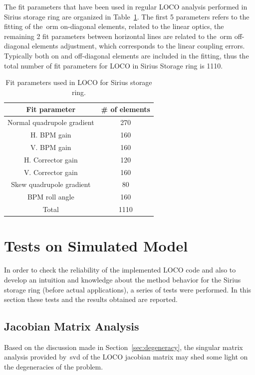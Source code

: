 The fit parameters that have been used in regular LOCO analysis performed in Sirius storage ring are organized in Table~\ref{tab:fit_params}. The first 5 parameters refers to the fitting of the~\gls{orm} on-diagonal elements, related to the linear optics, the remaining 2 fit parameters between horizontal lines are related to the~\gls{orm} off-diagonal elements adjustment, which corresponds to the linear coupling errors. Typically both on and off-diagonal elements are included in the fitting, thus the total number of fit parameters for LOCO in Sirius Storage ring is 1110.
\begin{table}
    \centering
    \caption{Fit parameters used in LOCO for Sirius storage ring.}
    \label{tab:fit_params}
    \begin{tabular}{cc}
        \toprule\toprule
        Fit parameter & \# of elements \\
        \hline
        Normal quadrupole gradient & 270 \\
        H. BPM gain & 160 \\
        V. BPM gain & 160 \\
        H. Corrector gain & 120 \\
        V. Corrector gain & 160 \\
        \hline
        Skew quadrupole gradient & 80 \\
        BPM roll angle & 160 \\ 
        \hline
        Total & 1110 \\
        \bottomrule\bottomrule
    \end{tabular}
\end{table}

\section{Tests on Simulated Model}
In order to check the reliability of the implemented LOCO code and also to develop an intuition and knowledge about the method behavior for the Sirius storage ring (before actual applications), a series of tests were performed. In this section these tests and the results obtained are reported.
\subsection{Jacobian Matrix Analysis}
Based on the discussion made in Section~\ref{sec:degeneracy}, the singular matrix analysis provided by~\gls{svd} of the LOCO jacobian matrix may shed some light on the degeneracies of the problem.

